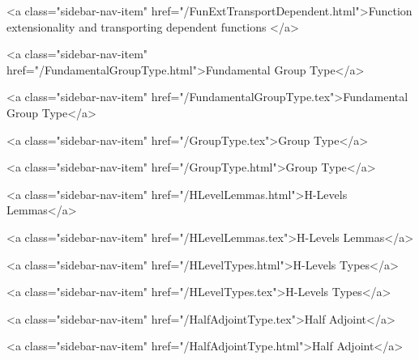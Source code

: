           <a class="sidebar-nav-item" href="/FunExtTransportDependent.html">Function extensionality and transporting dependent functions </a>
        
      
    
      
        
          <a class="sidebar-nav-item" href="/FundamentalGroupType.html">Fundamental Group Type</a>
        
      
    
      
        
          <a class="sidebar-nav-item" href="/FundamentalGroupType.tex">Fundamental Group Type</a>
        
      
    
      
        
          <a class="sidebar-nav-item" href="/GroupType.tex">Group Type</a>
        
      
    
      
        
          <a class="sidebar-nav-item" href="/GroupType.html">Group Type</a>
        
      
    
      
        
          <a class="sidebar-nav-item" href="/HLevelLemmas.html">H-Levels Lemmas</a>
        
      
    
      
        
          <a class="sidebar-nav-item" href="/HLevelLemmas.tex">H-Levels Lemmas</a>
        
      
    
      
        
          <a class="sidebar-nav-item" href="/HLevelTypes.html">H-Levels Types</a>
        
      
    
      
        
          <a class="sidebar-nav-item" href="/HLevelTypes.tex">H-Levels Types</a>
        
      
    
      
        
          <a class="sidebar-nav-item" href="/HalfAdjointType.tex">Half Adjoint</a>
        
      
    
      
        
          <a class="sidebar-nav-item" href="/HalfAdjointType.html">Half Adjoint</a>
        
